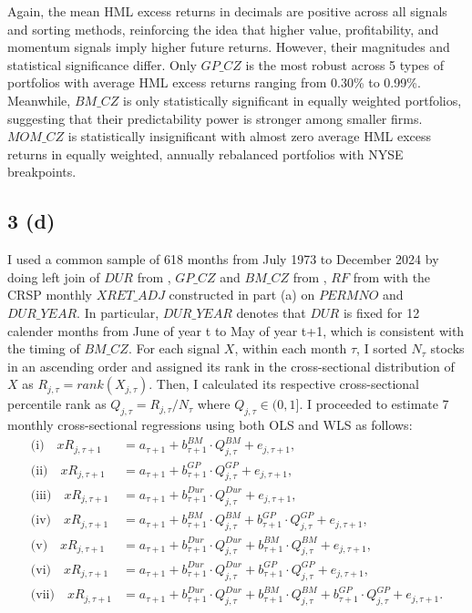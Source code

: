 \documentclass[11pt]{article}
\begin{document}
Again, the mean HML excess returns in decimals are positive across all signals and sorting methods, reinforcing the idea that higher value, profitability, and momentum signals imply higher future returns. However, their magnitudes and statistical significance differ. Only $GP\_CZ$ is the most robust across 5 types of portfolios with average HML excess returns ranging from 0.30\% to 0.99\%. Meanwhile, $BM\_CZ$ is only statistically significant in equally weighted portfolios, suggesting that their predictability power is stronger among smaller firms. $MOM\_CZ$ is statistically insignificant with almost zero average HML excess returns in equally weighted, annually rebalanced portfolios with NYSE breakpoints. 

\subsection*{3 (d)} 
I used a common sample of 618 months from July 1973 to December 2024 by doing left join of $DUR$ from \cite{goncalves2021short}, $GP\_CZ$ and $BM\_CZ$ from \cite{ChenZimmermann2022}, $RF$ from \cite{fama1993common} with the CRSP monthly $XRET\_ADJ$ constructed in part (a) on $PERMNO$ and $DUR\_YEAR$. In particular, $DUR\_YEAR$ denotes that $DUR$ is fixed for 12 calender months from June of year t to May of year t+1, which is consistent with the timing of $BM\_CZ$. For each signal $X$, within each month $\tau$, I sorted $N_{\tau}$ stocks in an ascending order and assigned its rank in the cross-sectional distribution of $X$ as $R_{j, \tau} = rank(X_{j, \tau})$. Then, I calculated its respective cross-sectional percentile rank as $Q_{j, \tau} = R_{j, \tau}/ N_\tau$ where $Q_{j, \tau} \in (0,1]$. I proceeded to estimate 7 monthly cross-sectional regressions using both OLS and WLS as follows: 
\[
\begin{aligned}
\text{(i)}\quad
xR_{j,\tau+1}
&=
a_{\tau+1}
+b^{BM}_{\tau+1} \cdot Q^{BM}_{j,\tau}
+e_{j,\tau+1},
\\[4pt]
\text{(ii)}\quad
xR_{j,\tau+1}
&=
a_{\tau+1}
+b^{GP}_{\tau+1} \cdot Q^{GP}_{j,\tau}
+e_{j,\tau+1},
\\[4pt]
\text{(iii)}\quad
xR_{j,\tau+1}
&=
a_{\tau+1}
+b^{Dur}_{\tau+1} \cdot Q^{Dur}_{j,\tau}
+e_{j,\tau+1},
\\[4pt]
\text{(iv)}\quad
xR_{j,\tau+1}
&=
a_{\tau+1}
+b^{BM}_{\tau+1} \cdot Q^{BM}_{j,\tau}
+b^{GP}_{\tau+1} \cdot Q^{GP}_{j,\tau}
+e_{j,\tau+1},
\\[4pt]
\text{(v)}\quad
xR_{j,\tau+1}
&=
a_{\tau+1}
+b^{Dur}_{\tau+1} \cdot Q^{Dur}_{j,\tau}
+b^{BM}_{\tau+1} \cdot Q^{BM}_{j,\tau}
+e_{j,\tau+1},
\\[4pt]
\text{(vi)}\quad
xR_{j,\tau+1}
&=
a_{\tau+1}
+b^{Dur}_{\tau+1} \cdot Q^{Dur}_{j,\tau}
+b^{GP}_{\tau+1} \cdot Q^{GP}_{j,\tau}
+e_{j,\tau+1},
\\[4pt]
\text{(vii)}\quad
xR_{j,\tau+1}
&=
a_{\tau+1}
+b^{Dur}_{\tau+1} \cdot Q^{Dur}_{j,\tau}
+b^{BM}_{\tau+1} \cdot Q^{BM}_{j,\tau}
+b^{GP}_{\tau+1} \cdot Q^{GP}_{j,\tau}
+e_{j,\tau+1}.
\end{aligned}
\]
\end{document}
